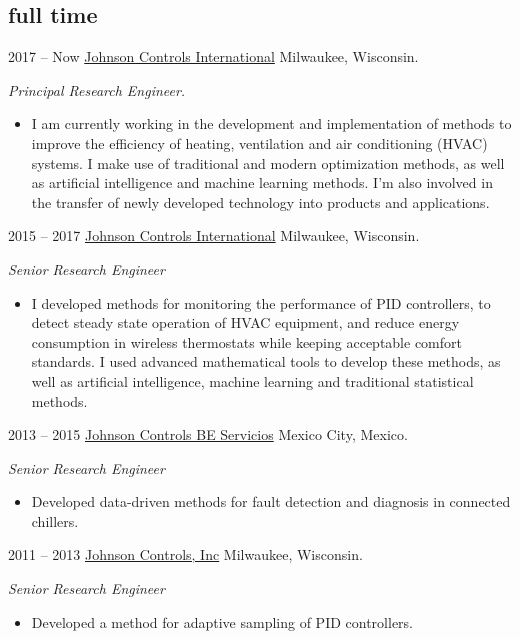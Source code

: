 \documentclass[]{friggeri-cv} %
\begin{document}
\subsection{full time}

\begin{entrylist}


\entry
{2017 -- Now}
{\href{http://www.johnsoncontrols.com}{Johnson Controls International}}
{Milwaukee, Wisconsin.}
{
\emph{Principal Research Engineer.}
\begin{itemize}
	\item I am currently working in the development and implementation of methods to improve the efficiency of heating, ventilation and air conditioning (HVAC) systems. I make use of traditional and modern optimization methods, as well as artificial intelligence and machine learning methods. I'm also involved in the transfer of newly developed technology into products and applications.
\end{itemize}
}
\entry
{2015 -- 2017}
{\href{http://www.johnsoncontrols.com}{Johnson Controls International}}
{Milwaukee, Wisconsin.}
{
\emph{Senior Research Engineer}
\begin{itemize}
\item I developed methods for monitoring the performance of PID controllers, to detect steady state operation of HVAC equipment, and reduce energy consumption in wireless thermostats while keeping acceptable comfort standards. I used advanced mathematical tools to develop these methods, as well as artificial intelligence, machine learning and traditional statistical methods.
\end{itemize}
}

\entry
{2013 -- 2015}
{\href{http://www.johnsoncontrols.com/es_mx}{Johnson Controls BE Servicios}}
{Mexico City, Mexico.}
{
\emph{Senior Research Engineer}
\begin{itemize}
\item Developed data-driven methods for fault detection and diagnosis in connected chillers.
\end{itemize}
}

\entry
{2011 -- 2013}
{\href{http://www.johnsoncontrols.com}{Johnson Controls, Inc}}
{Milwaukee, Wisconsin.}
{
\emph{Senior Research Engineer}
\begin{itemize}
\item Developed a method for adaptive sampling of PID controllers.
\end{itemize}
}

\end{entrylist}
\end{document}
